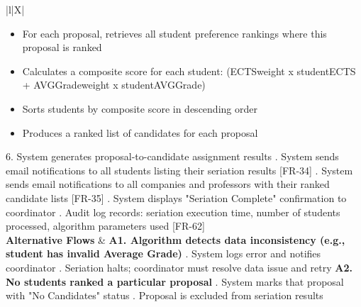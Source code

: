 \begin{xltabular}{\textwidth}{|l|X|}
\begin{itemize}
                \item {For each proposal, retrieves all student preference rankings where this proposal is ranked}
                \item {Calculates a composite score for each student: (ECTSweight x studentECTS + AVGGradeweight x studentAVGGrade)}
                \item {Sorts students by composite score in descending order}
                \item {Produces a ranked list of candidates for each proposal}
            \end{itemize}
        6. System generates proposal-to-candidate assignment results . System sends email notifications to all students listing their seriation results [FR-34] . System sends email notifications to all companies and professors with their ranked candidate lists [FR-35] . System displays "Seriation Complete" confirmation to coordinator . Audit log records: seriation execution time, number of students processed, algorithm parameters used [FR-62]  \\ \hline
    \textbf{Alternative Flows} &
        \textbf{A1. Algorithm detects data inconsistency (e.g., student has invalid Average Grade)} . System logs error and notifies coordinator . Seriation halts; coordinator must resolve data issue and retry \newline
        \textbf{A2. No students ranked a particular proposal} . System marks that proposal with "No Candidates" status . Proposal is excluded from seriation results \\ \hline
\end{xltabular}


